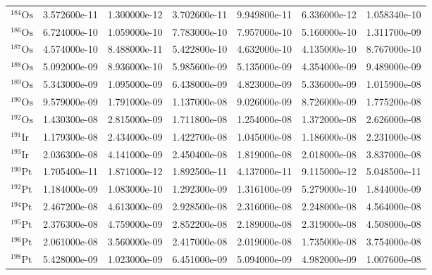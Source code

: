 \begin{tabular}{lrrrrrr}
$^{184}\mathrm{Os}$ &       3.572600e-11 &      1.300000e-12 &      3.702600e-11 &       9.949800e-11 &      6.336000e-12 &      1.058340e-10 \\
$^{186}\mathrm{Os}$ &       6.724000e-10 &      1.059000e-10 &      7.783000e-10 &       7.957000e-10 &      5.160000e-10 &      1.311700e-09 \\
$^{187}\mathrm{Os}$ &       4.574000e-10 &      8.488000e-11 &      5.422800e-10 &       4.632000e-10 &      4.135000e-10 &      8.767000e-10 \\
$^{188}\mathrm{Os}$ &       5.092000e-09 &      8.936000e-10 &      5.985600e-09 &       5.135000e-09 &      4.354000e-09 &      9.489000e-09 \\
$^{189}\mathrm{Os}$ &       5.343000e-09 &      1.095000e-09 &      6.438000e-09 &       4.823000e-09 &      5.336000e-09 &      1.015900e-08 \\
$^{190}\mathrm{Os}$ &       9.579000e-09 &      1.791000e-09 &      1.137000e-08 &       9.026000e-09 &      8.726000e-09 &      1.775200e-08 \\
$^{192}\mathrm{Os}$ &       1.430300e-08 &      2.815000e-09 &      1.711800e-08 &       1.254000e-08 &      1.372000e-08 &      2.626000e-08 \\
$^{191}\mathrm{Ir}$ &       1.179300e-08 &      2.434000e-09 &      1.422700e-08 &       1.045000e-08 &      1.186000e-08 &      2.231000e-08 \\
$^{193}\mathrm{Ir}$ &       2.036300e-08 &      4.141000e-09 &      2.450400e-08 &       1.819000e-08 &      2.018000e-08 &      3.837000e-08 \\
$^{190}\mathrm{Pt}$ &       1.705400e-11 &      1.871000e-12 &      1.892500e-11 &       4.137000e-11 &      9.115000e-12 &      5.048500e-11 \\
$^{192}\mathrm{Pt}$ &       1.184000e-09 &      1.083000e-10 &      1.292300e-09 &       1.316100e-09 &      5.279000e-10 &      1.844000e-09 \\
$^{194}\mathrm{Pt}$ &       2.467200e-08 &      4.613000e-09 &      2.928500e-08 &       2.316000e-08 &      2.248000e-08 &      4.564000e-08 \\
$^{195}\mathrm{Pt}$ &       2.376300e-08 &      4.759000e-09 &      2.852200e-08 &       2.189000e-08 &      2.319000e-08 &      4.508000e-08 \\
$^{196}\mathrm{Pt}$ &       2.061000e-08 &      3.560000e-09 &      2.417000e-08 &       2.019000e-08 &      1.735000e-08 &      3.754000e-08 \\
$^{198}\mathrm{Pt}$ &       5.428000e-09 &      1.023000e-09 &      6.451000e-09 &       5.094000e-09 &      4.982000e-09 &      1.007600e-08 \\

\end{tabular}
